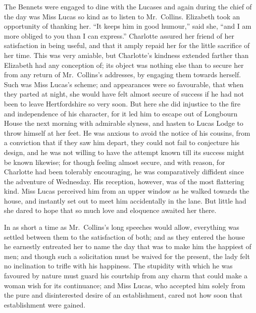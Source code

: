 \documentclass[12pt,english,oneside]{book}
\begin{document}
The Bennets were engaged to dine with the Lucases and again during
the chief of the day was Miss Lucas so kind as to listen to Mr.\ Collins.
Elizabeth took an opportunity of thanking her. {}``It keeps him in
good humour,'' said she, {}``and I am more obliged to you than I
can express.'' Charlotte assured her friend of her satisfaction in
being useful, and that it amply repaid her for the little sacrifice
of her time. This was very amiable, but Charlotte's kindness extended
farther than Elizabeth had any conception of; its object was nothing
else than to secure her from any return of Mr.\ Collins's addresses,
by engaging them towards herself. Such was Miss Lucas's scheme; and
appearances were so favourable, that when they parted at night, she
would have felt almost secure of success if he had not been to leave
Hertfordshire so very soon. But here she did injustice to the fire
and independence of his character, for it led him to escape out of
Longbourn House the next morning with admirable slyness, and hasten
to Lucas Lodge to throw himself at her feet. He was anxious to avoid
the notice of his cousins, from a conviction that if they saw him
depart, they could not fail to conjecture his design, and he was not
willing to have the attempt known till its success might be known
likewise; for though feeling almost secure, and with reason, for Charlotte
had been tolerably encouraging, he was comparatively diffident since
the adventure of Wednesday. His reception, however, was of the most
flattering kind. Miss Lucas perceived him from an upper window as
he walked towards the house, and instantly set out to meet him accidentally
in the lane. But little had she dared to hope that so much love and
eloquence awaited her there.

In as short a time as Mr.\ Collins's long speeches would allow, everything
was settled between them to the satisfaction of both; and as they
entered the house he earnestly entreated her to name the day that
was to make him the happiest of men; and though such a solicitation
must be waived for the present, the lady felt no inclination to trifle
with his happiness. The stupidity with which he was favoured by nature
must guard his courtship from any charm that could make a woman wish
for its continuance; and Miss Lucas, who accepted him solely from
the pure and disinterested desire of an establishment, cared not how
soon that establishment were gained.
\end{document}
